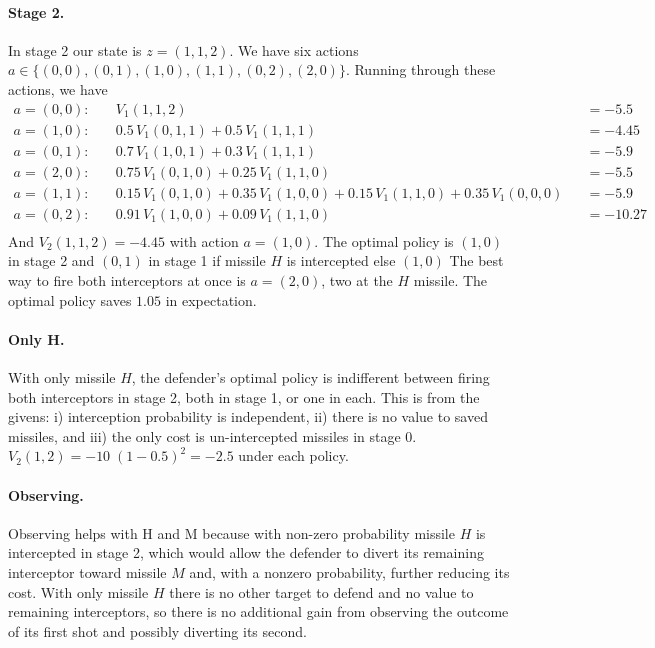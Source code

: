 \documentclass[11pt]{exam}
\begin{document}
\begin{questions}
\begin{parts}
        \paragraph{Stage 2.} In stage 2 our state is $z = (1,1,2)$. We have six actions $a\in\{(0,0), (0,1), (1,0), (1,1), (0,2), (2,0)\}$. 
        Running through these actions, we have
        \begin{align*}
            a=(0,0):&\quad V_1(1,1,2) &&= -5.5\\
            a=(1,0):&\quad 0.5\,V_1(0,1,1) + 0.5\,V_1(1,1,1) &&= -4.45\\
            a=(0,1):&\quad 0.7\,V_1(1,0,1) + 0.3\,V_1(1,1,1) &&= -5.9\\
            a=(2,0):&\quad 0.75\,V_1(0,1,0) + 0.25\,V_1(1,1,0) &&= -5.5\\
            a=(1,1):&\quad 0.15\,V_1(0,1,0) + 0.35\,V_1(1,0,0) + 0.15\,V_1(1,1,0) + 0.35\,V_1(0,0,0) &&= -5.9\\
            a=(0,2):&\quad 0.91\,V_1(1,0,0) + 0.09\,V_1(1,1,0) &&= -10.27\\
        \end{align*}
        And $V_2(1,1,2) = -4.45$ with action $a=(1,0)$. The optimal policy is $(1,0)$ in stage 2 and $(0,1)$ in stage 1 if missile $H$ is intercepted else $(1,0)$
        The best way to fire both interceptors at once is $a=(2,0)$, two at the $H$ missile. The optimal policy saves $1.05$ in expectation. 

        \paragraph{Only H.}
        With only missile $H$, the defender's optimal policy is indifferent between firing both interceptors in stage 2, both in stage 1, or one in each. This is from the givens: i) interception probability is independent, ii) there is no value to saved missiles, and iii) the only cost is un-intercepted missiles in stage 0. $V_2(1,2) = -10\;(1-0.5)^2=-2.5$ under each policy. 

        \paragraph{Observing.} Observing helps with H and M because with non-zero probability missile $H$ is intercepted in stage 2, which would allow the defender to divert its remaining interceptor toward missile $M$ and, with a nonzero probability, further reducing its cost. With only missile $H$ there is no other target to defend and no value to remaining interceptors, so there is no additional gain from observing the outcome of its first shot and possibly diverting its second. 


\end{parts}
\end{questions}
\end{document}
